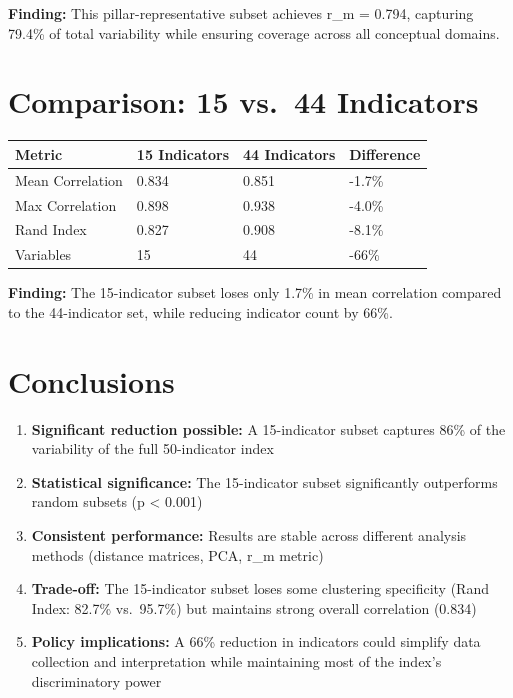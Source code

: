 \documentclass[
  letterpaper,
  DIV=11,
  numbers=noendperiod]{scrartcl}
\newcounter{none} %
\begin{document}
\textbf{Finding:} This pillar-representative subset achieves r\_m =
0.794, capturing 79.4\% of total variability while ensuring coverage
across all conceptual domains.

\section{Comparison: 15 vs.~44
Indicators}\label{comparison-15-vs.-44-indicators}

{\def\LTcaptype{none} %
\begin{longtable}[]{@{}llll@{}}
\toprule\noalign{}
Metric & 15 Indicators & 44 Indicators & Difference \\
\midrule\noalign{}
\endhead
\bottomrule\noalign{}
\endlastfoot
Mean Correlation & 0.834 & 0.851 & -1.7\% \\
Max Correlation & 0.898 & 0.938 & -4.0\% \\
Rand Index & 0.827 & 0.908 & -8.1\% \\
Variables & 15 & 44 & -66\% \\
\end{longtable}
}

\textbf{Finding:} The 15-indicator subset loses only 1.7\% in mean
correlation compared to the 44-indicator set, while reducing indicator
count by 66\%.

\section{Conclusions}\label{conclusions}

\begin{enumerate}
\def\labelenumi{\arabic{enumi}.}
\item
  \textbf{Significant reduction possible:} A 15-indicator subset
  captures 86\% of the variability of the full 50-indicator index
\item
  \textbf{Statistical significance:} The 15-indicator subset
  significantly outperforms random subsets (p \textless{} 0.001)
\item
  \textbf{Consistent performance:} Results are stable across different
  analysis methods (distance matrices, PCA, r\_m metric)
\item
  \textbf{Trade-off:} The 15-indicator subset loses some clustering
  specificity (Rand Index: 82.7\% vs.~95.7\%) but maintains strong
  overall correlation (0.834)
\item
  \textbf{Policy implications:} A 66\% reduction in indicators could
  simplify data collection and interpretation while maintaining most of
  the index's discriminatory power
\end{enumerate}
\end{document}
